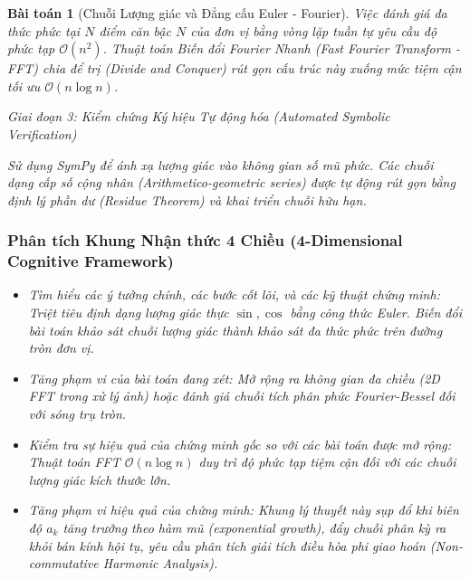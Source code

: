 \documentclass{article}
\newtheorem{baitoan}{Bài toán}
\begin{document}
\begin{baitoan}[Chuỗi Lượng giác và Đẳng cấu Euler - Fourier]
 Việc đánh giá đa thức phức tại $N$ điểm căn bậc $N$ của đơn vị bằng vòng lặp tuần tự yêu cầu độ phức tạp $\mathcal{O}(n^2)$. Thuật toán Biến đổi Fourier Nhanh (Fast Fourier Transform - FFT) chia để trị (Divide and Conquer) rút gọn cấu trúc này xuống mức tiệm cận tối ưu $\mathcal{O}(n \log n)$.



\vspace{0.5em}\noindent\emph{Giai đoạn 3: Kiểm chứng Ký hiệu Tự động hóa (Automated Symbolic Verification)}
 
 Sử dụng \textsf{SymPy} để ánh xạ lượng giác vào không gian số mũ phức. Các chuỗi dạng cấp số cộng nhân (Arithmetico-geometric series) được tự động rút gọn bằng định lý phần dư (Residue Theorem) và khai triển chuỗi hữu hạn.



 \subsubsection*{Phân tích Khung Nhận thức 4 Chiều (4-Dimensional Cognitive Framework)}
 \begin{itemize}
 \item \textit{Tìm hiểu các ý tưởng chính, các bước cốt lõi, và các kỹ thuật chứng minh}: Triệt tiêu định dạng lượng giác thực $\sin, \cos$ bằng công thức Euler. Biến đổi bài toán khảo sát chuỗi lượng giác thành khảo sát đa thức phức trên đường tròn đơn vị.
 \item \textit{Tăng phạm vi của bài toán đang xét}: Mở rộng ra không gian đa chiều (2D FFT trong xử lý ảnh) hoặc đánh giá chuỗi tích phân phức Fourier-Bessel đối với sóng trụ tròn.
 \item \textit{Kiểm tra sự hiệu quả của chứng minh gốc so với các bài toán được mở rộng}: Thuật toán FFT $\mathcal{O}(n \log n)$ duy trì độ phức tạp tiệm cận đối với các chuỗi lượng giác kích thước lớn.
 \item \textit{Tăng phạm vi hiệu quả của chứng minh}: Khung lý thuyết này sụp đổ khi biên độ $a_k$ tăng trưởng theo hàm mũ (exponential growth), đẩy chuỗi phân kỳ ra khỏi bán kính hội tụ, yêu cầu phân tích giải tích điều hòa phi giao hoán (Non-commutative Harmonic Analysis).
 \end{itemize}
\end{baitoan}
\end{document}
